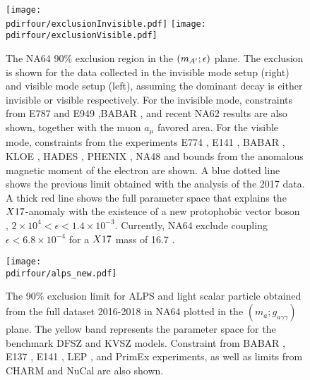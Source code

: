 \begin{figure}[tbh!]
  \centering
  \texttt{[image: \\pdirfour/exclusionInvisible.pdf]}
  \texttt{[image: \\pdirfour/exclusionVisible.pdf]}
  \caption[Exclusion limits in the $\dmplane$]{The NA64 90\% exclusion region in the $\dmplane$ plane. The exclusion is shown for the data collected in the invisible mode setup (right) and visible mode setup (left), assuming the dominant decay is either invisible or visible respectively\cite{NA64:2019imj,Banerjee:2019hmi}. For the invisible mode, constraints from E787 and E949 \cite{PhysRevD.89.095006,Essig:2013vha},BABAR \cite{PhysRevLett.119.131804}, and recent NA62 results \cite{CortinaGil:2019nuo} are also shown, together with the muon $a_{\mu}$ favored area. For the visible mode, constraints from the experiments E774 \cite{PhysRevLett.67.2942}, E141 \cite{PhysRevLett.59.755}, BABAR \cite{babar1}, KLOE \cite{kloe2}, HADES \cite{hades}, PHENIX \cite{phenix}, NA48 \cite{na48} and bounds from the anomalous magnetic moment of the electron \cite{PhysRevD.89.095006} are shown. A blue dotted line shows the previous limit obtained with the analysis of the 2017 data. A thick red line shows the full parameter space that explains the $X17$-anomaly with the existence of a new protophobic vector boson \cite{PhysRevD.95.035017}, $2 \times 10^{4} < \epsilon< 1.4 \times 10^{-3}$. Currently, NA64 exclude coupling $\epsilon < 6.8 \times 10^{-4}$ for a $X17$ mass of 16.7 \mev.}
  \label{fig:exclusion-dmplane}
\end{figure}

\begin{figure}[bth!]
  \centering
  \texttt{[image: \\pdirfour/alps\_new.pdf]}
  \caption[Exclusion limits in the $(m_{a};g_{a \gamma \gamma})$ plane for ALPS and light scalar]{The 90\% exclusion limit for ALPS and light scalar particle obtained from the full dataset 2016-2018 in NA64 plotted in the $(m_{a};g_{a \gamma \gamma})$ plane. The yellow band represents the parameter space for the benchmark DFSZ \cite{DINE1981199} and KVSZ \cite{PhysRevLett.43.103} models. Constraint from BABAR \cite{Dolan:2017osp}, E137 \cite{e137}, E141 \cite{blum}, LEP , and PrimEx \cite{PhysRevLett.123.071801} experiments, as well as limits from CHARM \cite{BERGSMA1985458} and NuCal \cite{Dobrich:2019dxc} are also shown.}
  \label{fig:exclusion-dmplane-alps}
\end{figure}

\newpage

